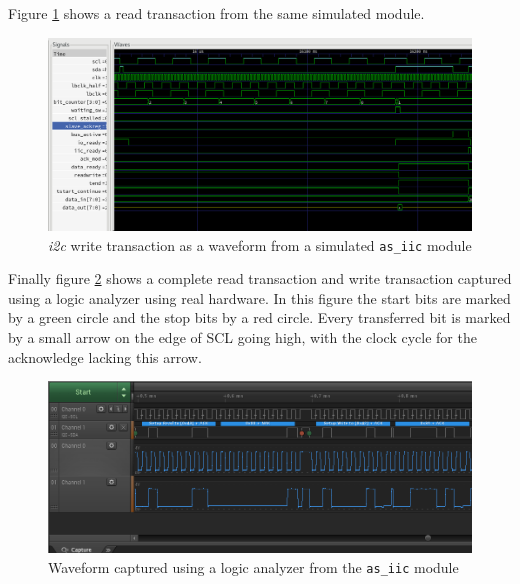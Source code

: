 Figure \ref{07-05-as-iic-wave-read} shows a read transaction from the same simulated module.

\begin{figure}[htbp]
\noindent \begin{centering}
\includegraphics[width=\textwidth]{figs/07-05-as-iic-wave-read}
\par\end{centering}
\caption{\textit{i2c} write transaction as a waveform from a simulated \texttt{as\_iic} module}
\label{07-05-as-iic-wave-read}
\end{figure}

Finally figure \ref{07-05-as-iic-wave-real} shows a complete read transaction and write transaction captured using a logic analyzer using real hardware.
In this figure the start bits are marked by a green circle and the stop bits by a red circle.
Every transferred bit is marked by a small arrow on the edge of SCL going high, with the clock cycle for the acknowledge lacking this arrow.

\begin{figure}[htbp]
\noindent \begin{centering}
\includegraphics[width=\textwidth]{figs/07-05-as-iic-wave-real}
\par\end{centering}
\caption{Waveform captured using a logic analyzer from the \texttt{as\_iic} module}
\label{07-05-as-iic-wave-real}
\end{figure}

